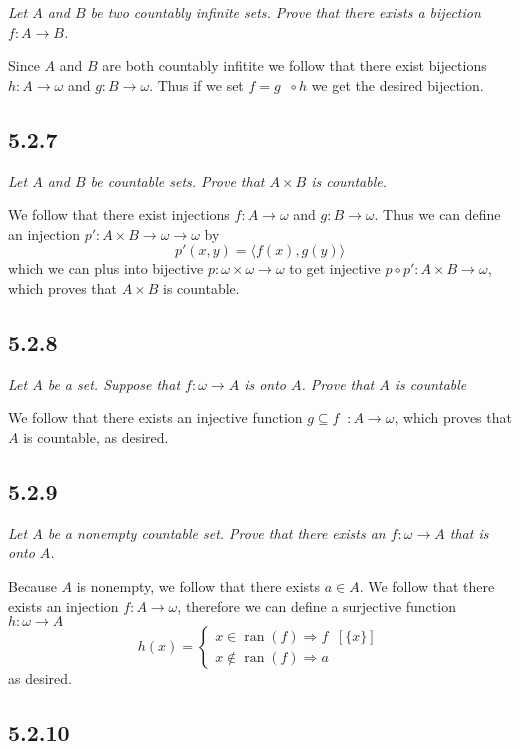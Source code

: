 \documentclass[11pt,oneside,titlepage]{book}
\DeclareMathOperator \inv {^{-1}}
\DeclareMathOperator \ra {\Rightarrow}
\DeclareMathOperator \ran {ran}
\newcommand{\eangle}[1]{\langle #1 \rangle}
\begin{document}
\textit{Let $A$ and $B$ be two countably infinite sets. Prove that there exists a bijection
  $f: A \to B$.}

Since $A$ and $B$ are both countably infitite we follow that there exist bijections
$h: A \to \omega$ and $g: B \to \omega$. Thus if we set
$f = g\inv \circ h $ we get the desired bijection.

\subsection*{5.2.7}

\textit{Let $A$ and $B$ be countable sets. Prove that $A \times B$ is countable.}

We follow that there exist injections $f: A \to \omega$ and $g: B \to \omega$. Thus
we can define an injection $p': A \times B \to \omega \to \omega$ by
$$p'(x, y) = \eangle{f(x), g(y)}$$
which we can plus into bijective $p: \omega \times \omega \to \omega$ to get injective
$p \circ p': A \times B \to \omega$, which proves that $A \times B$ is countable.

\subsection*{5.2.8}

\textit{Let $A$ be a set. Suppose that $f: \omega \to A$ is onto $A$. Prove that $A$ is
  countable}

We follow that there exists an injective function  $g \subseteq f\inv: A \to \omega$,
which proves that $A$ is countable, as desired.

\subsection*{5.2.9}

\textit{Let $A$ be a nonempty countable set. Prove that there exists an $f: \omega \to A$
  that is onto $A$.}

Because $A$ is nonempty, we follow that there exists $a \in A$. 
We follow that there exists an injection $f: A \to \omega$, therefore we can define a
surjective function $h: \omega \to A$
$$h(x) =
\begin{cases}
  x \in \ran(f) \ra f\inv[\{x\}] \\
  x \notin \ran(f) \ra a 
\end{cases}
$$
as desired.

\subsection*{5.2.10}
\end{document}
